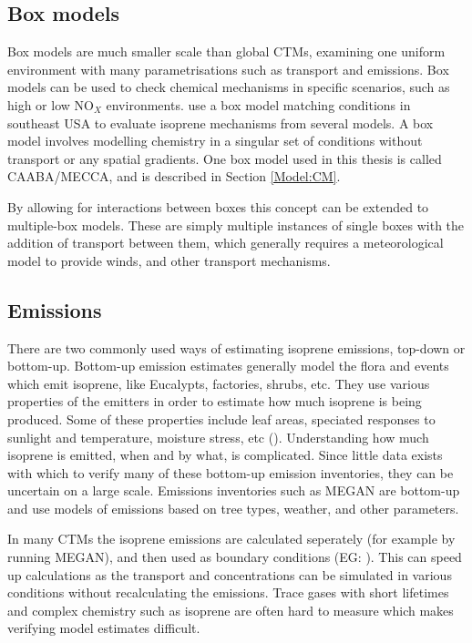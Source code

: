   
  \subsection{Box models}
    Box models are much smaller scale than global CTMs, examining one uniform environment with many parametrisations such as transport and emissions.
    Box models can be used to check chemical mechanisms in specific scenarios, such as high or low NO$_X$ environments.
    \cite{Marvin2017} use a box model matching conditions in southeast USA to evaluate isoprene mechanisms from several models.  
    A box model involves modelling chemistry in a singular set of conditions without transport or any spatial gradients.
    One box model used in this thesis is called CAABA/MECCA, and is described in Section \ref{Model:CM}.
    
    By allowing for interactions between boxes this concept can be extended to multiple-box models.
    These are simply multiple instances of single boxes with the addition of transport between them, which generally requires a meteorological model to provide winds, and other transport mechanisms.
  
  
  \subsection{Emissions}
  
    There are two commonly used ways of estimating isoprene emissions, top-down or bottom-up.
    Bottom-up emission estimates generally model the flora and events which emit isoprene, like Eucalypts, factories, shrubs, etc.
    They use various properties of the emitters in order to estimate how much isoprene is being produced.
    Some of these properties include leaf areas, speciated responses to sunlight and temperature, moisture stress, etc (\cite{Guenther1995,Guenther2006}).
    Understanding how much isoprene is emitted, when and by what, is complicated.
    Since little data exists with which to verify many of these bottom-up emission inventories, they can be uncertain on a large scale.
    Emissions inventories such as MEGAN are bottom-up and use models of emissions based on tree types, weather, and other parameters.
    
    In many CTMs the isoprene emissions are calculated seperately (for example by running MEGAN), and then used as boundary conditions (EG: \cite{Guenther2006}). 
    This can speed up calculations as the transport and concentrations can be simulated in various conditions without recalculating the emissions.
    Trace gases with short lifetimes and complex chemistry such as isoprene are often hard to measure which makes verifying model estimates difficult.
    
